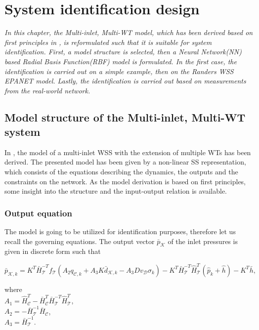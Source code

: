 \chapter{System identification design}
\label{identification_design}

\emph{In this chapter, the Multi-inlet, Multi-WT model, which has been derived based on first principles in , is reformulated such that it is suitable for system identification. First, a model structure is selected, then a Neural Network(NN) based Radial Basis Function(RBF) model is formulated. In the first case, the identification is carried out on a simple example, then on the Randers WSS EPANET model. Lastly, the identification is carried out based on measurements from the real-world network.}

\section{Model structure of the Multi-inlet, Multi-WT system}
\label{model_structure_of_the_multi_inlet_multi_WT_system}

In , the model of a multi-inlet WSS with the extension of multiple WTs has been derived. The presented model has been given by a non-linear SS representation, which consists of the equations describing the dynamics, the outputs and the constraints on the network. As the model derivation is based on first principles, some insight into the structure and the input-output relation is available. 

\subsection{Output equation}
\label{output_eq_identification}

The model is going to be utilized for identification purposes, therefore let us recall the governing equations. The output vector $\bar{p}_{\mathcal{K}}$ of the inlet pressures is given in discrete form such that

\begin{equation}
  \label{recall_output_eq}
  \bar{p}_{\mathcal{K},k} = K^T \bar{H}^{-T}_{\mathcal{T}}f_{\mathcal{T}}(A_2 q_{\mathcal{C},k} + A_3 K \bar{d}_{\mathcal{K},k} - A_3 D v_{\mathcal{D}} \sigma_k) - K^T\bar{H}^{-T}_{\mathcal{T}}\hat{H}^{T}_{\mathcal{T}} (\hat{p}_k + \hat{h}) - K^T\bar{h} ,
\end{equation} 

\begin{minipage}[t]{0.4\textwidth}
where\\
\hspace*{8mm} $A_1 = \hat{H}^T_{\mathcal{C}} -\bar{H}^T_{\mathcal{C}}\bar{H}^{-T}_{\mathcal{T}}\hat{H}^T_{\mathcal{T}}$, \vspace*{1.5mm}  \\
\hspace*{8mm} $A_2 = -\bar{H}^{-1}_{\mathcal{T}} \bar{H}_{\mathcal{C}} $, \vspace*{1.5mm}\\
\hspace*{8mm} $A_3 = \bar{H}^{-1}_{\mathcal{T}}$.
\end{minipage}

